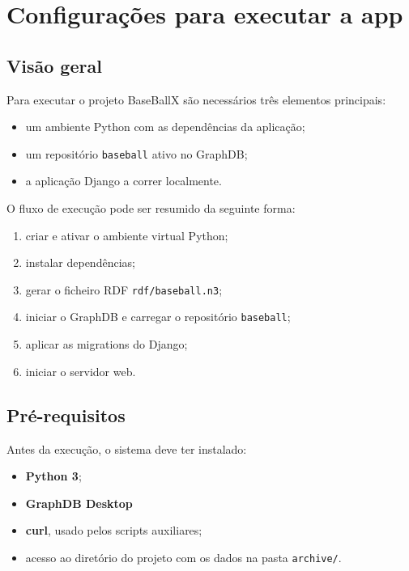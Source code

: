 \chapter{Configura\c{c}\~oes para executar a app}

\section{Vis\~ao geral}

Para executar o projeto BaseBallX s\~ao necess\'arios tr\^es elementos principais:

\begin{itemize}[leftmargin=*]
  \item um ambiente Python com as depend\^encias da aplica\c{c}\~ao;
  \item um reposit\'orio \texttt{baseball} ativo no GraphDB;
  \item a aplica\c{c}\~ao Django a correr localmente.
\end{itemize}

O fluxo de execu\c{c}\~ao pode ser resumido da seguinte forma:

\begin{enumerate}[leftmargin=*]
  \item criar e ativar o ambiente virtual Python;
  \item instalar depend\^encias;
  \item gerar o ficheiro RDF \texttt{rdf/baseball.n3};
  \item iniciar o GraphDB e carregar o reposit\'orio \texttt{baseball};
  \item aplicar as migrations do Django;
  \item iniciar o servidor web.
\end{enumerate}

\section{Pr\'e-requisitos}

Antes da execu\c{c}\~ao, o sistema deve ter instalado:

\begin{itemize}[leftmargin=*]
  \item \textbf{Python 3};
  \item \textbf{GraphDB Desktop}
  \item \textbf{curl}, usado pelos scripts auxiliares;
  \item acesso ao diret\'orio do projeto com os dados na pasta \texttt{archive/}.
\end{itemize}

